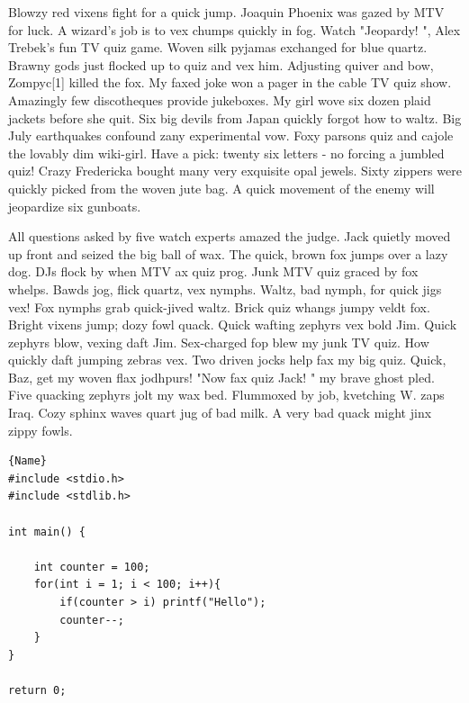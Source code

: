Blowzy red vixens fight for a quick jump. Joaquin Phoenix was gazed by MTV for luck. A wizard’s job is to vex chumps quickly in fog. Watch "Jeopardy! ", Alex Trebek's fun TV quiz game. Woven silk pyjamas exchanged for blue quartz. Brawny gods just flocked up to quiz and vex him. Adjusting quiver and bow, Zompyc[1] killed the fox. My faxed joke won a pager in the cable TV quiz show. Amazingly few discotheques provide jukeboxes. My girl wove six dozen plaid jackets before she quit. Six big devils from Japan quickly forgot how to waltz. Big July earthquakes confound zany experimental vow. Foxy parsons quiz and cajole the lovably dim wiki-girl. Have a pick: twenty six letters - no forcing a jumbled quiz! Crazy Fredericka bought many very exquisite opal jewels. Sixty zippers were quickly picked from the woven jute bag. A quick movement of the enemy will jeopardize six gunboats.

All questions asked by five watch experts amazed the judge. Jack quietly moved up front and seized the big ball of wax. The quick, brown fox jumps over a lazy dog. DJs flock by when MTV ax quiz prog. Junk MTV quiz graced by fox whelps. Bawds jog, flick quartz, vex nymphs. Waltz, bad nymph, for quick jigs vex! Fox nymphs grab quick-jived waltz. Brick quiz whangs jumpy veldt fox. Bright vixens jump; dozy fowl quack. Quick wafting zephyrs vex bold Jim. Quick zephyrs blow, vexing daft Jim. Sex-charged fop blew my junk TV quiz. How quickly daft jumping zebras vex. Two driven jocks help fax my big quiz. Quick, Baz, get my woven flax jodhpurs! "Now fax quiz Jack! " my brave ghost pled. Five quacking zephyrs jolt my wax bed. Flummoxed by job, kvetching W. zaps Iraq. Cozy sphinx waves quart jug of bad milk. A very bad quack might jinx zippy fowls.


\begin{lstlisting}[style=C++, caption=Example]{Name}
#include <stdio.h>
#include <stdlib.h>

int main() {

    int counter = 100;
    for(int i = 1; i < 100; i++){
        if(counter > i) printf("Hello");
        counter--;
    }
}

return 0;
\end{lstlisting}





